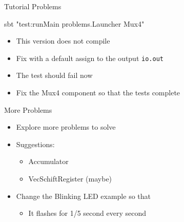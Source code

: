 \documentclass[xcolor=pdflatex,dvipsnames,table]{beamer}
\newcommand{\code}[1]{{\texttt{#1}}}
\begin{document}
\begin{frame}[fragile]{Tutorial Problems}
\begin{chisel}
sbt "test:runMain problems.Launcher Mux4"
\end{chisel}
\begin{itemize}
\item This version does not compile
\item Fix with a default assign to the output \code{io.out}
\item The test should fail now
\item Fix the Mux4 component so that the tests complete
\end{itemize}
\end{frame}

\begin{frame}[fragile]{More Problems}
\begin{itemize}
\item Explore more problems to solve
\item Suggestions:
\begin{itemize}
\item Accumulator
\item VecSchiftRegister (maybe)
\end{itemize}
\item Change the Blinking LED example so that
\begin{itemize}
\item It flashes for 1/5 second every second
\end{itemize}
\end{itemize}
\end{frame}
\end{document}
